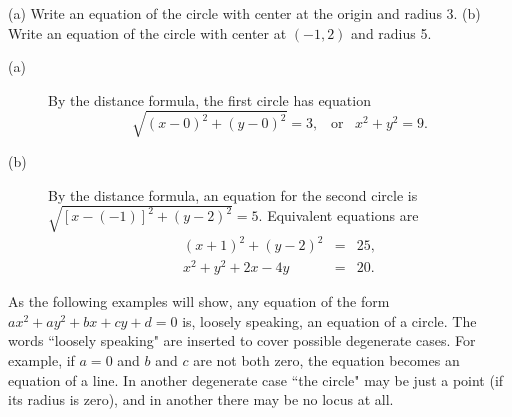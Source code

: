 \begin{example}
(a) Write an equation of the circle with center at the origin and radius 3. (b)
Write an equation of the circle with center at $(-1, 2)$ and radius 5.

\begin{description}
\item[(a)] By the distance formula, the first circle has equation
$$
\sqrt{(x-0)^2 + (y-0)^2} = 3, \;\;\; \mbox{or} \;\;\;  x^2 + y^2 = 9.
$$
\item[(b)] By the distance formula, an equation for the second circle is\linebreak
$\sqrt{[x-(-1)]^2 + (y-2)^2} = 5$. Equivalent equations are
\begin{eqnarray*}
(x + 1)^2 + (y - 2)^2 &=& 25, \\
  x^2 + y^2 + 2x - 4y &=& 20.
\end{eqnarray*}

\end{description}

As the following examples will show, any equation of the form $ax^2 + ay^2 + bx + cy + d = 0$ is, loosely speaking, an equation of a circle. The words ``loosely speaking" are inserted to cover possible degenerate cases. For example, if $a = 0$ and $b$ and $c$ are not both zero, the equation becomes an equation of a line. In another degenerate case ``the circle" may be just a point (if its radius is zero), and in another there may be no locus at all.
\end{example}
\medskip

